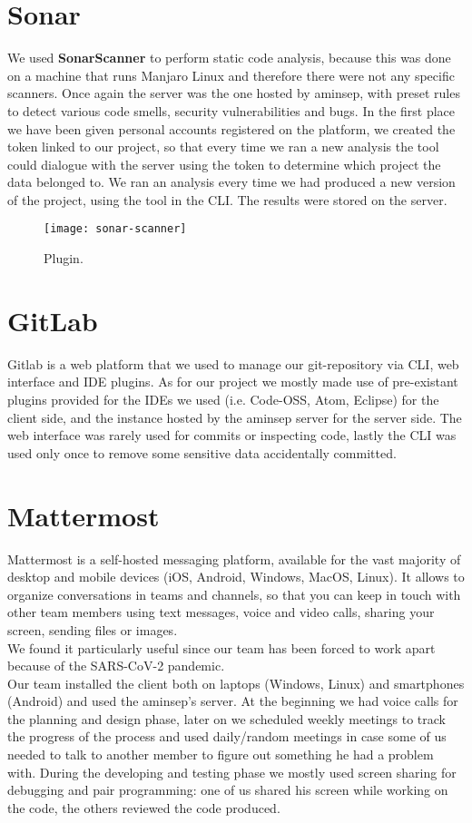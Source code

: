 \documentclass[a4paper,12pt]{report}
\begin{document}
\section{Sonar}
We used \textbf{SonarScanner} to perform static code analysis, because this was done on a machine that runs Manjaro Linux and therefore there were not any specific scanners. Once again the server was the one hosted by aminsep, with preset rules to detect various code smells, security vulnerabilities and bugs. 
In the first place we have been given personal accounts registered on the platform, we created the token linked to our project, so that every time we ran a new analysis the tool could dialogue with the server using the token to determine which project the data belonged to.
We ran an analysis every time we had produced a new version of the project, using the tool in the CLI. The results were stored on the server.\newpage

\begin{figure}[H]
	\centering
    \texttt{[image: sonar-scanner]}
    \caption{Plugin.}
    \label{fig:plugin}
\end{figure}

\section[GitLab] {GitLab}
Gitlab is a web platform that we used to manage our git-repository via CLI, web interface and IDE plugins.
As for our project we mostly made use of pre-existant plugins provided for the IDEs we used (i.e. Code-OSS, Atom, Eclipse) for the client side, and the instance hosted by the aminsep server for the server side. The web interface was rarely used for commits or inspecting code, lastly the CLI was used only once to remove some sensitive data accidentally committed.

\section[Mattermost] {Mattermost}
Mattermost is a self-hosted messaging platform, available for the vast majority of desktop and mobile devices (iOS, Android, Windows, MacOS, Linux). It allows to organize conversations in teams and channels, so that you can keep in touch with other team members using text messages, voice and video calls, sharing your screen, sending files or images. \\
We found it particularly useful since our team has been forced to work apart because of the SARS-CoV-2 pandemic. \\
Our team installed the client both on laptops (Windows, Linux) and smartphones (Android) and  used the aminsep's server. At the beginning we had voice calls for the planning and design phase, later on we scheduled weekly meetings to track the progress of the process and used daily/random meetings in case some of us needed to talk to another member to figure out something he had a problem with.
During the developing and testing phase we mostly used screen sharing for debugging and pair programming: one of us shared his screen while working on the code, the others reviewed the code produced.
\end{document}
